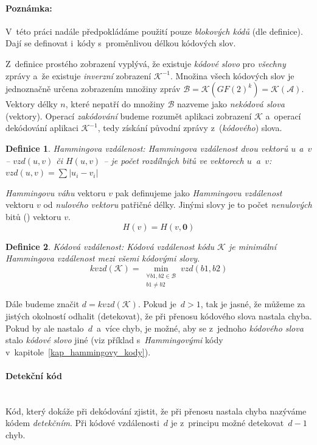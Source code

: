 \documentclass[thesis=M,czech,hidelinks]{FITthesis}[2012/06/26]
\newcommand{\0}{{\textcolor[gray]{0.75}{0}}}
\newtheorem{definice}{Definice}
\begin{document}
\paragraph{Poznámka:} V~této práci nadále předpokládáme použití pouze
\emph{blokových kódů} (dle definice). Dají se definovat i~kódy s~proměnlivou
délkou kódových slov.

Z~definice prostého zobrazení vyplývá, že existuje \emph{kódové slovo} pro
\emph{všechny} zprávy a~že existuje \emph{inverzní} zobrazení
$\mathcal{K}^{-1}$. Množina všech kódových slov je jednoznačně určena zobrazením
množiny zpráv $\mathcal{B} = \mathcal{K}(GF(2)^k) = \mathcal{K}(\mathcal{A})$.
Vektory délky $n$, které nepatří do množiny $\mathcal{B}$ nazveme jako
\emph{nekódová slova} (vektory). Operací \emph{zakódování} budeme rozumět
aplikaci zobrazení $\mathcal{K}$ a~operací dekódování aplikaci
$\mathcal{K}^{-1}$, tedy získání původní zprávy z~(\emph{kódového}) slova.

\begin{definice}{Hammingova vzdálenost:}
    \emph{Hammingova vzdálenost} dvou vektorů $u$ a~$v$ -- $vzd(u,v)$ či
    $H(u,v)$ -- je počet rozdílných \emph{bitů} ve vektorech $u$~a~$v$:
    $vzd(u,v) = \sum \left| u_i - v_i \right|$
\end{definice}

\emph{Hammingovu váhu} vektoru $v$ pak definujeme jako \emph{Hammingovu
vzdálenost} vektoru $v$ od \emph{nulového vektoru} patřičné délky. Jinými slovy
je to počet \emph{nenulových} bitů () vektoru $v$.
$$ H(v) = H(v,\mathbf{0}) $$


\begin{definice}{Kódová vzdálenost:}
    Kódová vzdálenost kódu $\mathcal{K}$ je minimální \emph{Hammingova
    vzdálenost} mezi všemi kódovými slovy.
    $$
        kvzd(\mathcal{K}) =
        \min_{\substack{\forall b1,b2 \in \mathcal{B} \\ b1 \neq b2}} vzd(b1,b2)
    $$
\end{definice}

Dále budeme značit $d = kvzd(\mathcal{K})$. Pokud je~$d > 1$, tak je jasné, že
můžeme za jistých okolností odhalit (detekovat), že při přenosu kódového slova
nastala chyba. Pokud by ale nastalo~$d$~a~více chyb, je možné, aby se z~jednoho
\emph{kódového slova} stalo \emph{kódové slovo} jiné (viz příklad
s~\emph{Hammingovými} kódy v~kapitole~\ref{kap_hammingovy_kody}).

\paragraph{Detekční kód} \hfil \\
Kód, který dokáže při dekódování zjistit, že při přenosu nastala chyba nazýváme
kódem \emph{detekčním}. Při kódové vzdálenosti~$d$ je z~principu možné
detekovat~$d-1$ chyb.
\end{document}
